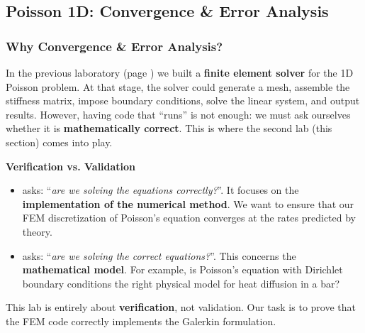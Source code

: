 \subsection{Poisson 1D: Convergence \& Error Analysis}

\subsubsection{Why Convergence \& Error Analysis?}

In the previous laboratory (page \pageref{subsection: FEM for Poisson 1D}) we built a \textbf{finite element solver} for the 1D Poisson problem. At that stage, the solver could generate a mesh, assemble the stiffness matrix, impose boundary conditions, solve the linear system, and output results. However, having code that ``runs'' is not enough: we must ask ourselves whether it is \textbf{mathematically correct}. This is where the second lab (this section) comes into play.

\begin{flushleft}
    \textcolor{Green3}{ \textbf{Verification vs. Validation}}
\end{flushleft}
\begin{itemize}
    \item {} asks: ``\emph{are we solving the equations correctly?}''. It focuses on the \textbf{implementation of the numerical method}. We want to ensure that our FEM discretization of Poisson's equation converges at the rates predicted by theory.
    \item {} asks: ``\emph{are we solving the correct equations?}''. This concerns the \textbf{mathematical model}. For example, is Poisson's equation with Dirichlet boundary conditions the right physical model for heat diffusion in a bar?
\end{itemize}
This lab is entirely about \textbf{verification}, not validation. Our task is to prove that the FEM code correctly implements the Galerkin formulation.

